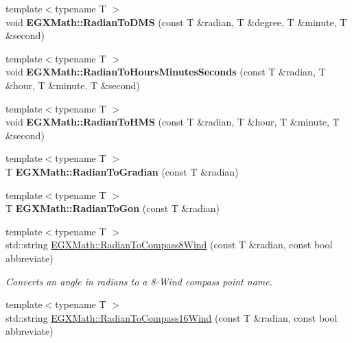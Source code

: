 \begin{DoxyCompactItemize}
{\footnotesize template$<$typename T $>$ }\\void {\bfseries E\+G\+X\+Math\+::\+Radian\+To\+D\+MS} (const T \&radian, T \&degree, T \&minute, T \&second)
\item 
\mbox{\label{group___e_g_x_math-_angle_conversions_ga3467598d89af2b8ff68af50b39bb19e2}} 
{\footnotesize template$<$typename T $>$ }\\void {\bfseries E\+G\+X\+Math\+::\+Radian\+To\+Hours\+Minutes\+Seconds} (const T \&radian, T \&hour, T \&minute, T \&second)
\item 
\mbox{\label{group___e_g_x_math-_angle_conversions_ga55b5fba9307f34ab8db57391789a90cc}} 
{\footnotesize template$<$typename T $>$ }\\void {\bfseries E\+G\+X\+Math\+::\+Radian\+To\+H\+MS} (const T \&radian, T \&hour, T \&minute, T \&second)
\item 
\mbox{\label{group___e_g_x_math-_angle_conversions_ga3c1607eae50cbf0186c42485bb3878d5}} 
{\footnotesize template$<$typename T $>$ }\\T {\bfseries E\+G\+X\+Math\+::\+Radian\+To\+Gradian} (const T \&radian)
\item 
\mbox{\label{group___e_g_x_math-_angle_conversions_ga36912e5a810b64c271c4dafc17f4ca45}} 
{\footnotesize template$<$typename T $>$ }\\T {\bfseries E\+G\+X\+Math\+::\+Radian\+To\+Gon} (const T \&radian)
\item 
{\footnotesize template$<$typename T $>$ }\\std\+::string \mbox{\hyperlink{group___e_g_x_math-_angle_conversions_ga3c06a01860f69bcd57fab918037318b3}{E\+G\+X\+Math\+::\+Radian\+To\+Compass8\+Wind}} (const T \&radian, const bool abbreviate)
\begin{DoxyCompactList}\small\item\em Converts an angle in radians to a 8-\/\+Wind compass point name. \end{DoxyCompactList}\item 
{\footnotesize template$<$typename T $>$ }\\std\+::string \mbox{\hyperlink{group___e_g_x_math-_angle_conversions_gae3be24eac965abfab281c6307fed482a}{E\+G\+X\+Math\+::\+Radian\+To\+Compass16\+Wind}} (const T \&radian, const bool abbreviate)

\end{DoxyCompactItemize}
